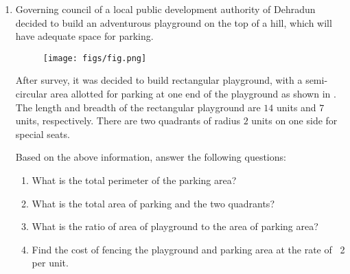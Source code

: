 \documentclass{article}
\begin{document}
\begin{enumerate}
    \item Governing council of a local public development authority of Dehradun decided to build an adventurous playground on the top of a hill, which will have adequate space for parking.
    
    \begin{figure}[!ht]
    \centering
    \texttt{[image: figs/fig.png]}
    \caption{}
    \label{fig:figure1}
\end{figure}
After survey, it was decided to build rectangular playground, with a semi-circular area allotted for parking at one end of the playground as shown in . The length and breadth of the rectangular playground are $14$ units and $7$ units, respectively. There are two quadrants of radius $2$ units on one side for special seats.

Based on the above information, answer the following questions:
\begin{enumerate}
    \item What is the total perimeter of the parking area?
    \item What is the total area of parking and the two quadrants?
    \item What is the ratio of area of playground to the area of parking area?
    \item Find the cost of fencing the playground and parking area at the rate of \rupee~2 per unit.
\end{enumerate}
    \end{enumerate}
\end{document}
